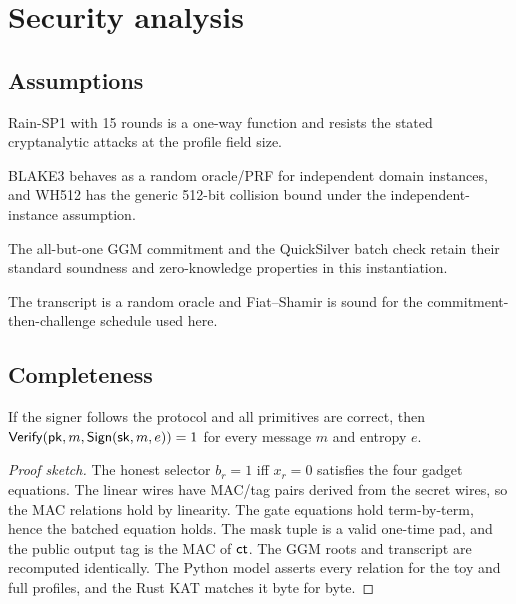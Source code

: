 \documentclass[11pt,a4paper]{article}
\begin{document}
\section{Security analysis}
\label{sec:security}

\subsection{Assumptions}

\begin{assumption}[Rain-SP1]
Rain-SP1 with 15 rounds is a one-way function and resists the stated
cryptanalytic attacks at the profile field size.
\end{assumption}

\begin{assumption}[BLAKE3/WH512]
BLAKE3 behaves as a random oracle/PRF for independent domain instances, and
WH512 has the generic 512-bit collision bound under the independent-instance
assumption.
\end{assumption}

\begin{assumption}
The all-but-one GGM commitment and the QuickSilver batch check retain their
standard soundness and zero-knowledge properties in this instantiation.
\end{assumption}

\begin{assumption}
The transcript is a random oracle and Fiat--Shamir is sound for the
commitment-then-challenge schedule used here.
\end{assumption}

\subsection{Completeness}

\begin{theorem}[Completeness]
If the signer follows the protocol and all primitives are correct, then
$\mathsf{Verify}(\mathsf{pk},m,\mathsf{Sign}(\mathsf{sk},m,e))=1$ for every message $m$ and entropy $e$.
\end{theorem}
\begin{proof}[Proof sketch]
The honest selector $b_r=1$ iff $x_r=0$ satisfies the four gadget equations.
The linear wires have MAC/tag pairs derived from the secret wires, so the MAC
relations hold by linearity. The gate equations hold term-by-term, hence the
batched equation holds. The mask tuple is a valid one-time pad, and the public
output tag is the MAC of $\mathsf{ct}$. The GGM roots and transcript are recomputed
identically. The Python model asserts every relation for the toy and full
profiles, and the Rust KAT matches it byte for byte.
\end{proof}
\end{document}
